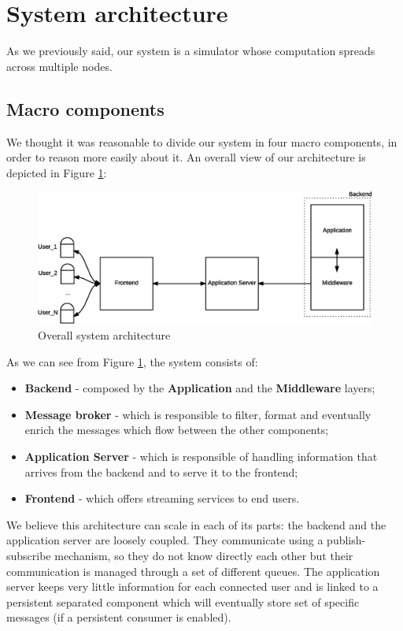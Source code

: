 \section{System architecture}
As we previously said, our system is a simulator whose computation spreads
across multiple nodes.

\subsection{Macro components}

We thought it was reasonable to divide our system in four macro components,
in order to reason more easily about it. An overall view of our architecture
is depicted in Figure \ref{fig:sd-sys-arch-overall}:

\begin{figure}[H]
  \centering
  \includegraphics[scale=0.5,keepaspectratio]
    {images/solution/overall-arch.eps}
  \caption{Overall system architecture}
  \label{fig:sd-sys-arch-overall}
\end{figure}

As we can see from Figure \ref{fig:sd-sys-arch-overall}, the system consists of:

\begin{itemize}
  \item \textbf{Backend} - composed by the \textbf{Application} and the
    \textbf{Middleware} layers;
  \item \textbf{Message broker} - which is responsible to filter, format
  and eventually enrich the messages which flow between the other components;
  \item \textbf{Application Server} - which is responsible of handling
    information that arrives from the backend and to serve it to the frontend;
  \item \textbf{Frontend} - which offers streaming services to end users.
\end{itemize}

We believe this architecture can scale in each of its parts: the backend and
the application server are loosely coupled. They communicate using a
publish-subscribe mechanism, so they do not know directly each other but their
communication is managed through a set of different queues.
The application server keeps very little information for
each connected user and is linked to a persistent separated component
which will eventually store set of specific messages
(if a persistent consumer is enabled).

